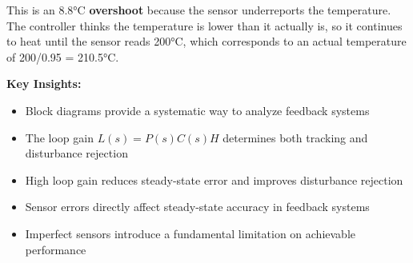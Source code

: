 \documentclass[11pt,a4paper]{article}
\begin{document}
This is an 8.8°C \textbf{overshoot} because the sensor underreports the temperature. The controller thinks the temperature is lower than it actually is, so it continues to heat until the sensor reads 200°C, which corresponds to an actual temperature of 200/0.95 = 210.5°C.

\textbf{Key Insights:}
\begin{itemize}
  \item Block diagrams provide a systematic way to analyze feedback systems
  \item The loop gain $L(s) = P(s)C(s)H$ determines both tracking and disturbance rejection
  \item High loop gain reduces steady-state error and improves disturbance rejection
  \item Sensor errors directly affect steady-state accuracy in feedback systems
  \item Imperfect sensors introduce a fundamental limitation on achievable performance
\end{itemize}
\end{document}
